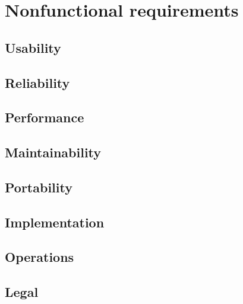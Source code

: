 \section{Nonfunctional requirements}
\subsection{Usability}
\subsection{Reliability}
\subsection{Performance}
\subsection{Maintainability}
\subsection{Portability}
\subsection{Implementation}
\subsection{Operations}
\subsection{Legal}